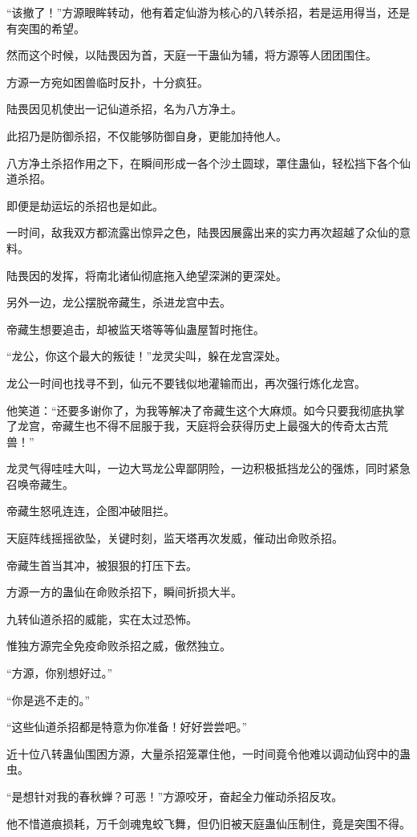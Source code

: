 \begin{this_body}
“该撤了！”方源眼眸转动，他有着定仙游为核心的八转杀招，若是运用得当，还是有突围的希望。

然而这个时候，以陆畏因为首，天庭一干蛊仙为辅，将方源等人团团围住。

方源一方宛如困兽临时反扑，十分疯狂。

陆畏因见机使出一记仙道杀招，名为八方净土。

此招乃是防御杀招，不仅能够防御自身，更能加持他人。

八方净土杀招作用之下，在瞬间形成一各个沙土圆球，罩住蛊仙，轻松挡下各个仙道杀招。

即便是劫运坛的杀招也是如此。

一时间，敌我双方都流露出惊异之色，陆畏因展露出来的实力再次超越了众仙的意料。

陆畏因的发挥，将南北诸仙彻底拖入绝望深渊的更深处。

另外一边，龙公摆脱帝藏生，杀进龙宫中去。

帝藏生想要追击，却被监天塔等等仙蛊屋暂时拖住。

“龙公，你这个最大的叛徒！”龙灵尖叫，躲在龙宫深处。

龙公一时间也找寻不到，仙元不要钱似地灌输而出，再次强行炼化龙宫。

他笑道：“还要多谢你了，为我等解决了帝藏生这个大麻烦。如今只要我彻底执掌了龙宫，帝藏生也不得不屈服于我，天庭将会获得历史上最强大的传奇太古荒兽！”

龙灵气得哇哇大叫，一边大骂龙公卑鄙阴险，一边积极抵挡龙公的强炼，同时紧急召唤帝藏生。

帝藏生怒吼连连，企图冲破阻拦。

天庭阵线摇摇欲坠，关键时刻，监天塔再次发威，催动出命败杀招。

帝藏生首当其冲，被狠狠的打压下去。

方源一方的蛊仙在命败杀招下，瞬间折损大半。

九转仙道杀招的威能，实在太过恐怖。

惟独方源完全免疫命败杀招之威，傲然独立。

“方源，你别想好过。”

“你是逃不走的。”

“这些仙道杀招都是特意为你准备！好好尝尝吧。”

近十位八转蛊仙围困方源，大量杀招笼罩住他，一时间竟令他难以调动仙窍中的蛊虫。

“是想针对我的春秋蝉？可恶！”方源咬牙，奋起全力催动杀招反攻。

他不惜道痕损耗，万千剑魂鬼蛟飞舞，但仍旧被天庭蛊仙压制住，竟是突围不得。


\end{this_body}
